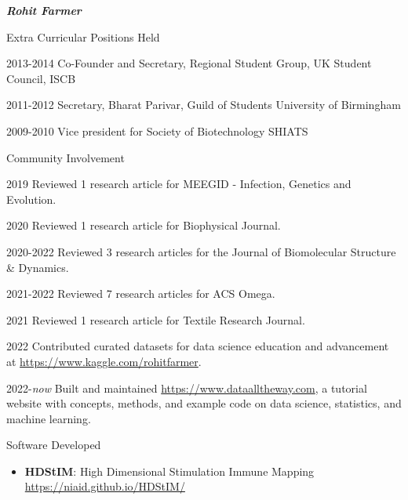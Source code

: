 \documentclass[10pt]{article}
\begin{document}
\begin{cv}{\huge \it \bfseries Rohit Farmer}
\vskip3pt
\begin{cvlist}{Extra Curricular Positions Held}
	\item[2013-2014] Co-Founder and Secretary, Regional Student Group, UK \hfill Student Council, ISCB
	\item[2011-2012] Secretary, Bharat Parivar, Guild of Students \hfill University of Birmingham
	\item[2009-2010] Vice president for Society of Biotechnology \hfill SHIATS
\end{cvlist}

\vskip3pt
\begin{cvlist}{Community Involvement}
        \item[2019] Reviewed 1 research article for MEEGID - Infection, Genetics and Evolution.
        \item[2020] Reviewed 1 research article for Biophysical Journal.
        \item[2020-2022] Reviewed 3 research articles for the Journal of Biomolecular Structure \& Dynamics.
        \item[2021-2022] Reviewed 7 research articles for ACS Omega.
        \item[2021] Reviewed 1 research article for Textile Research Journal.
        \item[2022] Contributed curated datasets for data science education and advancement at \url{https://www.kaggle.com/rohitfarmer}.
        \item[2022-\emph{now}] Built and maintained \url{https://www.dataalltheway.com}, a tutorial website with concepts, methods, and example code on data science, statistics, and machine learning.
\end{cvlist}

\renewenvironment{thebibliography}[1]{
\setlength{\topsep}{0em}
\setlength{\labelsep}{.5em}
\begin{etaremune}{
\setlength{\itemsep}{0.5em}}
}{\end{etaremune}}
\renewcommand{\bibitem}[1]{\item}

\setlength{\cvlabelsep}{0mm}
\setlength{\cvlabelwidth}{0mm}
\renewcommand{\labelitemi}{}

\vskip3pt
\begin{cvlist}{Software Developed}
	\item {\begin{itemize}
			\item{\bf HDStIM}: High Dimensional Stimulation Immune Mapping \url{https://niaid.github.io/HDStIM/}
                \end{itemize}}
\end{cvlist}


\end{cv}
\end{document}
